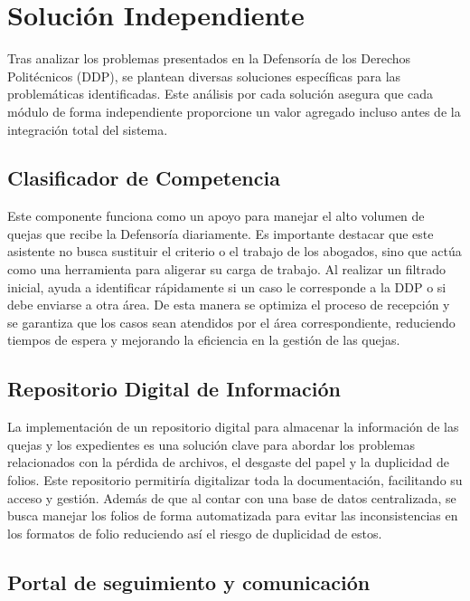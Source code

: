 \section{Solución Independiente}

\begin{flushleft}
\justifying
Tras analizar los problemas presentados en la Defensoría de los Derechos Politécnicos (DDP), se plantean diversas soluciones específicas para las problemáticas identificadas. 
Este análisis por cada solución asegura que cada módulo de forma independiente proporcione un valor agregado incluso antes de la integración total del sistema.

\subsection{Clasificador de Competencia}

Este componente funciona como un apoyo para manejar el alto volumen de quejas que recibe la Defensoría diariamente. Es importante destacar que este asistente no busca sustituir el criterio o el trabajo de los abogados, sino que actúa como una herramienta para aligerar su carga de trabajo. Al realizar un filtrado inicial, ayuda a identificar rápidamente si un caso le corresponde a la DDP o si debe enviarse a otra área. De esta manera se optimiza el proceso de recepción y se garantiza que los casos sean atendidos por el área correspondiente, reduciendo tiempos de espera y mejorando la eficiencia en la gestión de las quejas.

\subsection{Repositorio Digital de Información}

La implementación de un repositorio digital para almacenar la información de las quejas y los expedientes es una solución clave para abordar los problemas relacionados con la pérdida de archivos, el desgaste del papel y la duplicidad de folios. Este repositorio permitiría digitalizar toda la documentación, facilitando su acceso y gestión. Además de que al contar con una base de datos centralizada, se busca manejar los folios de forma automatizada para evitar las inconsistencias en los formatos de folio reduciendo así el riesgo de duplicidad de estos.

\subsection{Portal de seguimiento y comunicación}


\end{flushleft}
